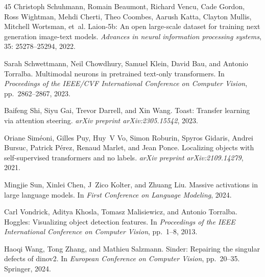 \documentclass{article}
\begin{document}
\begin{thebibliography}{45}
Christoph Schuhmann, Romain Beaumont, Richard Vencu, Cade Gordon, Ross Wightman, Mehdi Cherti, Theo Coombes, Aarush Katta, Clayton Mullis, Mitchell Wortsman, et~al.
\newblock Laion-5b: An open large-scale dataset for training next generation image-text models.
\newblock \emph{Advances in neural information processing systems}, 35: 25278--25294, 2022.

Sarah Schwettmann, Neil Chowdhury, Samuel Klein, David Bau, and Antonio Torralba.
\newblock Multimodal neurons in pretrained text-only transformers.
\newblock In \emph{Proceedings of the IEEE/CVF International Conference on Computer Vision}, pp.\  2862--2867, 2023.

Baifeng Shi, Siyu Gai, Trevor Darrell, and Xin Wang.
\newblock Toast: Transfer learning via attention steering.
\newblock \emph{arXiv preprint arXiv:2305.15542}, 2023.

Oriane Sim{\'e}oni, Gilles Puy, Huy~V Vo, Simon Roburin, Spyros Gidaris, Andrei Bursuc, Patrick P{\'e}rez, Renaud Marlet, and Jean Ponce.
\newblock Localizing objects with self-supervised transformers and no labels.
\newblock \emph{arXiv preprint arXiv:2109.14279}, 2021.

Mingjie Sun, Xinlei Chen, J~Zico Kolter, and Zhuang Liu.
\newblock Massive activations in large language models.
\newblock In \emph{First Conference on Language Modeling}, 2024.

Carl Vondrick, Aditya Khosla, Tomasz Malisiewicz, and Antonio Torralba.
\newblock Hoggles: Visualizing object detection features.
\newblock In \emph{Proceedings of the IEEE International Conference on Computer Vision}, pp.\  1--8, 2013.

Haoqi Wang, Tong Zhang, and Mathieu Salzmann.
\newblock Sinder: Repairing the singular defects of dinov2.
\newblock In \emph{European Conference on Computer Vision}, pp.\  20--35. Springer, 2024.


\end{thebibliography}
\end{document}
